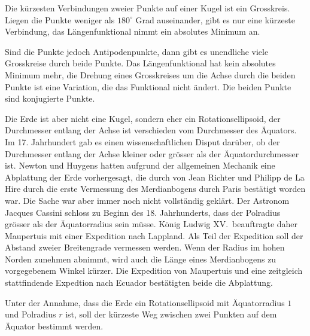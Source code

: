 \begin{beispiel}
Die kürzesten Verbindungen zweier Punkte auf einer Kugel ist ein
Grosskreis.
Liegen die Punkte weniger als $180^\circ$ Grad auseinander, gibt es
nur eine kürzeste Verbindung, das Längenfunktional nimmt ein
absolutes Minimum an.

Sind die Punkte jedoch Antipodenpunkte, dann gibt es unendliche viele
Grosskreise durch beide Punkte.
Das Längenfunktional hat kein absolutes Minimum mehr, die Drehung eines
Grosskreises um die Achse durch die beiden Punkte ist eine Variation,
die das Funktional nicht ändert.
Die beiden Punkte sind konjugierte Punkte.
\end{beispiel}

Die Erde ist aber nicht eine Kugel, sondern eher ein Rotationsellipsoid,
der Durchmesser entlang der Achse ist verschieden vom Durchmesser des 
Äquators.
Im 17. Jahrhundert gab es einen wissenschaftlichen Disput darüber,
ob der Durchmesser entlang der Achse kleiner oder grösser als der
Äquatordurchmesser ist.
Newton und Huygens hatten aufgrund der allgemeinen Mechanik eine Abplattung
der Erde vorhergesagt, die durch von Jean Richter und Philipp de La Hire
durch die erste Vermessung des Merdianbogens durch Paris bestätigt 
worden war.
Die Sache war aber immer noch nicht vollständig geklärt.
Der Astronom Jacques Cassini schloss zu Beginn des 18. Jahrhunderts,
dass der Polradius grösser als der Äquatorradius sein müsse.
König Ludwig XV.~beauftragte daher Maupertuis mit einer Expedition
nach Lappland.
Als Teil der Expedition soll der Abstand zweier Breitengrade
vermessen werden.
Wenn der Radius im hohen Norden zunehmen abnimmt, wird auch die Länge
eines Merdianbogens zu vorgegebenem Winkel kürzer.
Die Expedition von Maupertuis und eine zeitgleich stattfindende Expedtion
nach Ecuador bestätigten beide die Abplattung.

\begin{beispiel}
Unter der Annahme, dass die Erde ein Rotationsellipsoid mit Äquatorradius
$1$ und Polradius $r$ ist, soll der kürzeste Weg zwischen zwei Punkten
auf dem Äquator bestimmt werden.
\end{beispiel}



